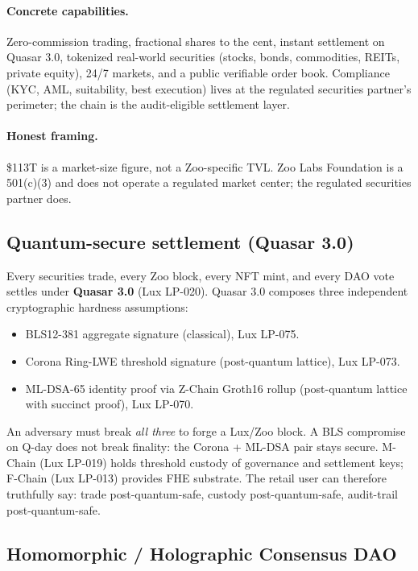 \paragraph{Concrete capabilities.} Zero-commission trading, fractional
shares to the cent, instant settlement on Quasar 3.0, tokenized
real-world securities (stocks, bonds, commodities, REITs, private
equity), 24/7 markets, and a public verifiable order book. Compliance
(KYC, AML, suitability, best execution) lives at the regulated securities partner's
perimeter; the chain is the audit-eligible settlement layer.

\paragraph{Honest framing.} \$113T is a market-size figure, not a
Zoo-specific TVL. Zoo Labs Foundation is a 501(c)(3) and does not
operate a regulated market center; the regulated securities partner does.

\subsection{Quantum-secure settlement (Quasar 3.0)}

Every securities trade, every Zoo block, every NFT mint, and every DAO
vote settles under \textbf{Quasar 3.0} (Lux LP-020). Quasar 3.0
composes three independent cryptographic hardness assumptions:

\begin{itemize}[nosep,leftmargin=1.2em]
\item BLS12-381 aggregate signature (classical), Lux LP-075.
\item Corona Ring-LWE threshold signature (post-quantum lattice),
   Lux LP-073.
\item ML-DSA-65 identity proof via Z-Chain Groth16 rollup
   (post-quantum lattice with succinct proof), Lux LP-070.
\end{itemize}

An adversary must break \emph{all three} to forge a Lux/Zoo block. A
BLS compromise on Q-day does not break finality: the Corona +
ML-DSA pair stays secure. M-Chain (Lux LP-019) holds threshold custody
of governance and settlement keys; F-Chain (Lux LP-013) provides FHE
substrate. The retail user can therefore truthfully say: trade
post-quantum-safe, custody post-quantum-safe, audit-trail
post-quantum-safe.

\subsection{Homomorphic / Holographic Consensus DAO}

